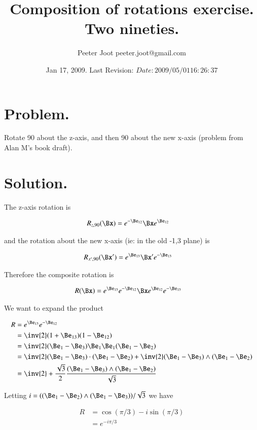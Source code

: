 \documentclass{article}
\title{ Composition of rotations exercise.  Two nineties. }
\author{Peeter Joot \quad peeter.joot@gmail.com}
\date{ Jan 17, 2009.  Last Revision: $Date: 2009/05/01 16:26:37 $ }
\begin{document}
\maketitle{}
\section{ Problem. }

Rotate 90 about the z-axis, and then 90 about the new x-axis (problem from Alan M's book draft).

\section{ Solution. }

The z-axis rotation is 

\begin{align*}
R_{z,90}(\Bx) &= e^{-\Be_{12}} \Bx e^{\Be_{12}}
\end{align*}

and the rotation about the new x-axis (ie: in the old -1,3 plane) is

\begin{align*}
R_{x',90}(\Bx') &= e^{\Be_{13}} \Bx' e^{-\Be_{13}}
\end{align*}

Therefore the composite rotation is

\begin{align*}
R(\Bx) &= e^{\Be_{13}} e^{-\Be_{12}} \Bx e^{\Be_{12}} e^{-\Be_{13}}
\end{align*}

We want to expand the product

\begin{align*}
R 
&= e^{\Be_{13}} e^{-\Be_{12}} \\
&= \inv{2} (1 + \Be_{13}) (1 - \Be_{12}) \\
&= \inv{2} (\Be_1 - \Be_{3}) \Be_1 \Be_1 (\Be_1 - \Be_{2}) \\
&= \inv{2} (\Be_1 - \Be_{3}) \cdot (\Be_1 - \Be_{2}) +\inv{2} (\Be_1 - \Be_{3}) \wedge (\Be_1 - \Be_{2}) \\
&= \inv{2} + \frac{\sqrt{3}}{2} \frac{(\Be_1 - \Be_{3}) \wedge (\Be_1 - \Be_{2})}{\sqrt{3}} \\
\end{align*}

Letting $i = ((\Be_1 - \Be_{2}) \wedge (\Be_1 - \Be_{3}))/\sqrt{3}$ we have

\begin{align*}
R 
&= \cos(\pi/3) - i\sin(\pi/3) \\
&= e^{-i \pi/3}
\end{align*}
\end{document}
